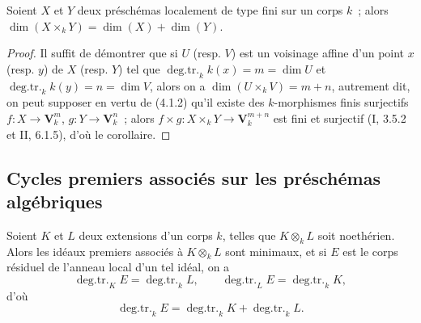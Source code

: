 \begin{corollary}[4.1.5]
\label{IV.2.4.1.5-fr}
Soient $X$ et $Y$ deux préschémas localement de type fini sur un corps $k$~;
alors $\dim(X\times_k Y)=\dim(X)+\dim(Y)$.
\end{corollary}

\begin{proof}
Il suffit de démontrer que si $U$ (resp. $V$) est un voisinage affine d'un
point $x$ (resp. $y$) de $X$ (resp. $Y$) tel que
$\operatorname{deg.tr.}_k k(x)=m=\dim U$ et
$\operatorname{deg.tr.}_k k(y)=n=\dim V$, alors on a
$\dim(U\times_k V)=m+n$, autrement dit, on peut supposer en vertu de (4.1.2)
qu'il existe des $k$-morphismes finis surjectifs
$f:X\to\mathbf V_k^m$, $g:Y\to\mathbf V_k^n$~; alors
$f\times g:X\times_k Y\to\mathbf V_k^{m+n}$ est fini et surjectif
(I, 3.5.2 et II, 6.1.5), d'où le corollaire.
\end{proof}

\subsection{Cycles premiers associés sur les préschémas algébriques}
\label{subsection:IV.2.4.2-fr}

\begin{proposition}[4.2.1]
\label{IV.2.4.2.1-fr}
Soient $K$ et $L$ deux extensions d'un corps $k$, telles que $K\otimes_k L$
soit noethérien. Alors les idéaux premiers associés à $K\otimes_k L$ sont
minimaux, et si $E$ est le corps résiduel de l'anneau local d'un tel idéal, on
a
\begin{equation}
\tag{4.2.1.1}
\label{IV.2.4.2.1.1-fr}
\operatorname{deg.tr.}_K E=\operatorname{deg.tr.}_k L,
\qquad
\operatorname{deg.tr.}_L E=\operatorname{deg.tr.}_k K,
\end{equation}
d'où
\begin{equation}
\tag{4.2.1.2}
\label{IV.2.4.2.1.2-fr}
\operatorname{deg.tr.}_k E
=\operatorname{deg.tr.}_k K+\operatorname{deg.tr.}_k L.
\end{equation}
\end{proposition}

